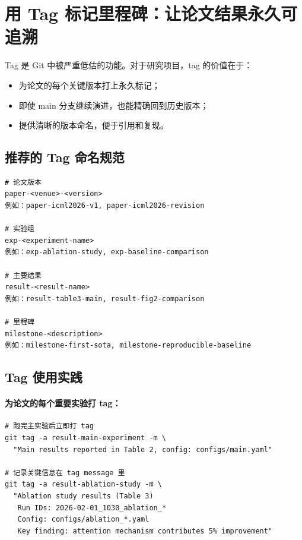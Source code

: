 \section{用 Tag 标记里程碑：让论文结果永久可追溯}

Tag 是 Git 中被严重低估的功能。对于研究项目，tag 的价值在于：
\begin{itemize}
  \item 为论文的每个关键版本打上永久标记；
  \item 即使 main 分支继续演进，也能精确回到历史版本；
  \item 提供清晰的版本命名，便于引用和复现。
\end{itemize}

\subsection{推荐的 Tag 命名规范}

\begin{verbatim}
# 论文版本
paper-<venue>-<version>
例如：paper-icml2026-v1, paper-icml2026-revision

# 实验组
exp-<experiment-name>
例如：exp-ablation-study, exp-baseline-comparison

# 主要结果
result-<result-name>
例如：result-table3-main, result-fig2-comparison

# 里程碑
milestone-<description>
例如：milestone-first-sota, milestone-reproducible-baseline
\end{verbatim}

\subsection{Tag 使用实践}

\paragraph{为论文的每个重要实验打 tag：}

\begin{verbatim}
# 跑完主实验后立即打 tag
git tag -a result-main-experiment -m \
  "Main results reported in Table 2, config: configs/main.yaml"

# 记录关键信息在 tag message 里
git tag -a result-ablation-study -m \
  "Ablation study results (Table 3)
   Run IDs: 2026-02-01_1030_ablation_*
   Config: configs/ablation_*.yaml
   Key finding: attention mechanism contributes 5% improvement"
\end{verbatim}

